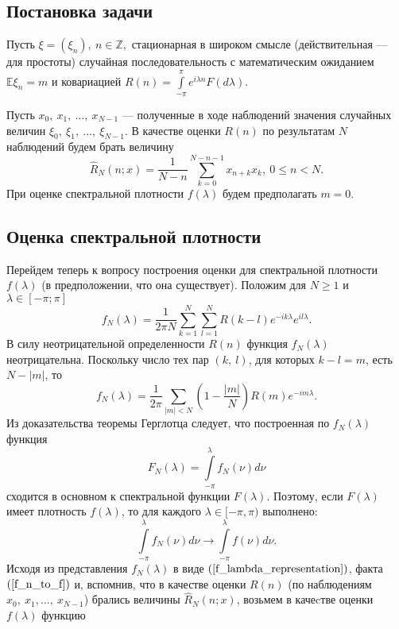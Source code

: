 \subsection*{Постановка задачи}

Пусть $\xi = (\xi_n),~ n \in \mathbb{Z},$ стационарная в широком смысле (действительная --- для простоты) случайная последовательность с математическим ожиданием $\mathbb{E} \xi_n = m$ и ковариацией $R(n) = \int\limits_{-\pi}^{\pi}{e^{i \lambda n} F(d \lambda)}$.

Пусть $x_0,~ x_1,~ \ldots,~ x_{N-1}$ --- полученные в ходе наблюдений значения случайных величин $\xi_0,~ \xi_1,~ \ldots,~ \xi_{N-1}.$
В качестве оценки $R(n)$ по результатам $N$ наблюдений будем брать величину
\[\hat{R}_N(n;x) = \frac{1}{N - n} \sum\limits_{k=0}^{N - n - 1}{x_{n+k}x_{k}},~ 0 \leq n < N.\]
При оценке спектральной плотности $f(\lambda)$ будем предполагать $m = 0$.

\subsection*{Оценка спектральной плотности}
Перейдем теперь к вопросу построения оценки для спектральной плотности $f(\lambda)$ (в предположении, что она существует).
Положим для $N \geq 1$ и $\lambda \in [-\pi;\pi]$
\begin{equation}
	f_N(\lambda) = \frac{1}{2\pi N} \sum\limits_{k=1}^{N} \sum\limits_{l=1}^{N}{R(k - l)e^{-ik\lambda} e^{il\lambda}.}
	\label{f_lambda_raw_representation}
\end{equation}
В силу неотрицательной определенности $R(n)$ функция $f_N(\lambda)$ неотрицательна. Поскольку число тех пар $(k,~l)$, для которых $k-l=m$, есть $N - |m|$, то
\begin{equation}
	f_N(\lambda) = \frac{1}{2\pi} \sum\limits_{|m| < N}{\left(1 - \frac{|m|}{N}\right)R(m) e^{-im\lambda}.}
	\label{f_lambda_representation}
\end{equation}
Из доказательства теоремы Герглотца следует, что построенная по $f_N(\lambda)$ функция 
\[F_N(\lambda) = \int\limits_{-\pi}^{\lambda}{f_N(\nu)d\nu}\]
сходится в основном к спектральной функции $F(\lambda)$. 
Поэтому, если $F(\lambda)$ имеет плотность $f(\lambda)$, то для каждого $\lambda \in [-\pi, \pi)$ выполнено:
\begin{equation}
	\int\limits_{-\pi}^{\lambda}{f_N(\nu)d\nu} \to \int\limits_{-\pi}^{\lambda}{f(\nu)d\nu.}
	\label{f_n_to_f}
\end{equation}
Исходя из представления $f_N(\lambda)$ в виде $(\ref{f_lambda_representation})$, факта $(\ref{f_n_to_f})$ и, вспомнив, что в качестве оценки $R(n)$ (по наблюдениям $x_0,~ x_1, \dots,~ x_{N-1}$) брались величины $\hat{R}_N(n;x)$, возьмем в качеcтве оценки $f(\lambda)$ функцию

